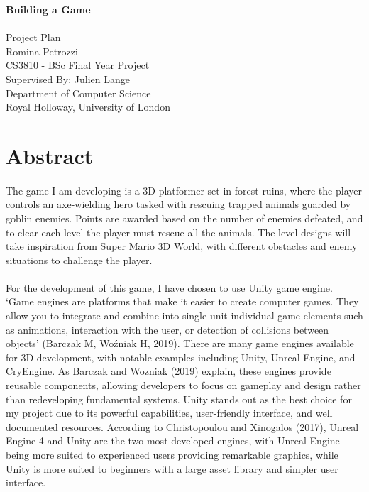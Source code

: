 \documentclass[12pt]{article}
\begin{document}
\begin{titlepage}
    \centering
    \vspace*{5cm}
    \LARGE\textbf{Building a Game}\\
    \vspace{1cm}
    \hrulefill\\[0.5cm] %
    \large Project Plan\\
    \vspace{0.5cm}
    \large Romina Petrozzi\\
    \vspace{0.5cm}
    \large CS3810 - BSc Final Year Project\\
    \vspace{2cm}
    \large Supervised By: Julien Lange\\
    \vspace{0.5cm}
    \large Department of Computer Science\\
    \large Royal Holloway, University of London\\
    \vfill
\end{titlepage}



\section*{\centering Abstract}
\paragraph{}
The game I am developing is a 3D platformer set in forest ruins, where the player controls an axe-wielding hero tasked with rescuing trapped animals guarded by goblin enemies. Points are awarded based on the number of enemies defeated, and to clear each level the player must rescue all the animals. The level designs will take inspiration from Super Mario 3D World, with different obstacles and enemy situations to challenge the player. 
\paragraph{}
For the development of this game, I have chosen to use Unity game engine. ‘Game engines are platforms that make it easier to create computer games. They allow you to integrate and combine into single unit individual game elements such as animations, interaction with the user, or detection of collisions between objects’ (Barczak M, Woźniak H, 2019). There are many game engines available for 3D development, with notable examples including Unity, Unreal Engine, and CryEngine. As Barczak and Wozniak (2019) explain, these engines provide reusable components, allowing developers to focus on gameplay and design rather than redeveloping fundamental systems. Unity stands out as the best choice for my project due to its powerful capabilities, user-friendly interface, and well documented resources. According to Christopoulou and Xinogalos (2017), Unreal Engine 4 and Unity are the two most developed engines, with Unreal Engine being more suited to experienced users providing remarkable graphics, while Unity is more suited to beginners with a large asset library and simpler user interface.
\end{document}
